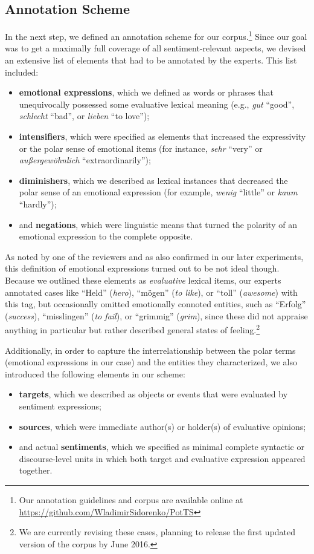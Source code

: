 \subsection{Annotation Scheme}\label{subsec:snt:ascheme}
In the next step, we defined an annotation scheme for our
corpus.\footnote{Our annotation guidelines and corpus are available
  online at
  {\scriptsize\url{https://github.com/WladimirSidorenko/PotTS}}} Since
our goal was to get a maximally full coverage of all
sentiment-relevant aspects, we devised an extensive list of elements
that had to be annotated by the experts.  This list included:
\begin{itemize}
  \item\textbf{emotional expressions}, which we defined as words or
    phrases that unequivocally possessed some evaluative lexical
    meaning (e.g., \emph{gut} ``good'', \emph{schlecht} ``bad'', or
    \emph{lieben} ``to love'');
  \item\textbf{intensifiers}, which were specified as elements that
    increased the expressivity or the polar sense of emotional items
    (for instance, \emph{sehr} ``very'' or
    \emph{au\ss{}ergew\"ohnlich} ``extraordinarily'');
  \item\textbf{diminishers}, which we described as lexical instances
    that decreased the polar sense of an emotional expression (for
    example, \emph{wenig} ``little'' or \emph{kaum} ``hardly'');
  \item and \textbf{negations}, which were linguistic means that
    turned the polarity of an emotional expression to the complete
    opposite.
\end{itemize}
As noted by one of the reviewers and as also confirmed in our later
experiments, this definition of emotional expressions turned out to be
not ideal though.  Because we outlined these elements as
\emph{evaluative} lexical items, our experts annotated cases like
``Held'' (\emph{hero}), ``m\"ogen'' (\emph{to like}), or ``toll''
(\emph{awesome}) with this tag, but occasionally omitted emotionally
connoted entities, such as ``Erfolg'' (\emph{success}), ``misslingen''
(\emph{to fail}), or ``grimmig'' (\emph{grim}), since these did not
appraise anything in particular but rather described general states of
feeling.\footnote{We are currently revising these cases, planning to
  release the first updated version of the corpus by June 2016.}

Additionally, in order to capture the interrelationship between the
polar terms (emotional expressions in our case) and the entities they
characterized, we also introduced the following elements in our
scheme:
\begin{itemize}
  \item\textbf{targets}, which we described as objects or events that
    were evaluated by sentiment expressions;
  \item\textbf{sources}, which were immediate author(s) or holder(s)
    of evaluative opinions;
  \item and actual \textbf{sentiments}, which we specified as minimal
    complete syntactic or discourse-level units in which both target
    and evaluative expression appeared together.
\end{itemize}

